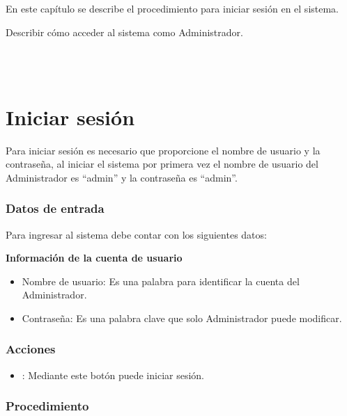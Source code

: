 En este capítulo se describe el procedimiento para iniciar sesión en el sistema.\\

\begin{objetivos}
	\item Describir cómo acceder al sistema como Administrador.
\end{objetivos}\\ \\

\section{Iniciar sesión}
Para iniciar sesión es necesario que proporcione el nombre de usuario y la contraseña, al iniciar el sistema por primera vez el nombre de usuario del Administrador es ``admin'' y la contraseña es ``admin''.

\subsubsection{Datos de entrada}

\begin{description}
	\item Para ingresar al sistema debe contar con los siguientes datos: \hspace{10pt}
	
	\begin{description}
	    \item \textbf{Información de la cuenta de usuario}
	    \begin{itemize}
		  \item Nombre de usuario: Es una palabra para identificar la cuenta del Administrador.
		  \item Contraseña: Es una palabra clave que solo Administrador puede modificar.
	    \end{itemize}
	 \end{description}
\end{description}

\subsubsection{Acciones}
\begin{itemize}
  \item {}: Mediante este botón puede iniciar sesión.
\end{itemize}

\subsubsection{Procedimiento}

